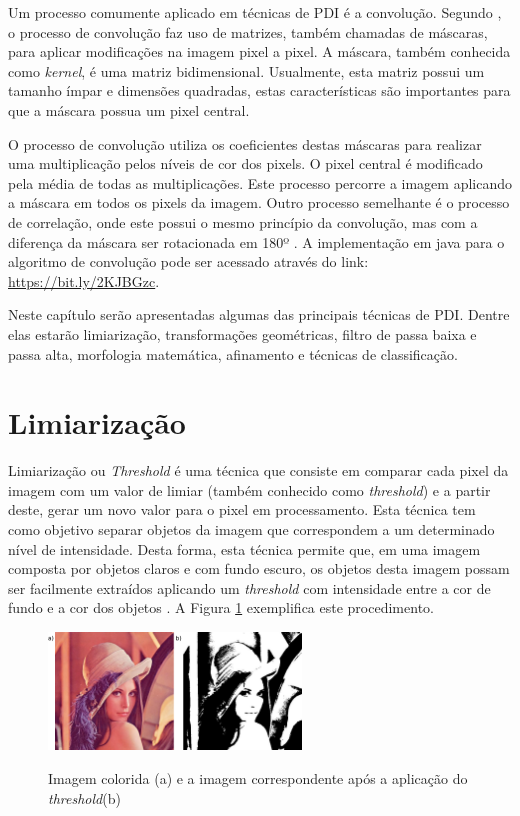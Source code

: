 \documentclass[
	12pt,				%
	oneside,			%
	a4paper,			%
	english,			%
	french,				%
	spanish,			%
	brazil,				%
	]{abntex2}
\begin{document}
Um processo comumente aplicado em técnicas de PDI é a convolução. Segundo \citet{pedriniSchwartz:2008}, o processo de convolução faz uso de matrizes, também chamadas de máscaras, para aplicar modificações na imagem pixel a pixel. A máscara, também conhecida como \textit{kernel}, é uma matriz bidimensional. Usualmente, esta matriz possui um tamanho ímpar e dimensões quadradas, estas características são importantes para que a máscara possua um pixel central.

O processo de convolução utiliza os coeficientes destas máscaras para realizar uma multiplicação pelos níveis de cor dos pixels. O pixel central é modificado pela média de todas as multiplicações. Este processo percorre a imagem aplicando a máscara em todos os pixels da imagem. Outro processo semelhante é o processo de correlação, onde este possui o mesmo princípio da convolução, mas com a diferença da máscara ser rotacionada em 180º \cite{gonzalesWoods:2008}. A implementação em java para o algoritmo de convolução pode ser acessado através do link: \url{https://bit.ly/2KJBGzc}.

Neste capítulo serão apresentadas algumas das principais técnicas de PDI. Dentre elas estarão limiarização, transformações geométricas, filtro de passa baixa e passa alta, morfologia matemática, afinamento e técnicas de classificação.
\section{Limiarização}
\label{sec:limiarizacao}

Limiarização ou \textit{Threshold} é uma técnica que consiste em comparar cada pixel da imagem com um valor de limiar (também conhecido como \textit{threshold}) e a partir deste, gerar um novo valor para o pixel em processamento. Esta técnica tem como objetivo separar objetos da imagem que correspondem a um determinado nível de intensidade. Desta forma, esta técnica permite que, em uma imagem composta por objetos claros e com fundo escuro, os objetos desta imagem possam ser facilmente extraídos aplicando um \textit{threshold} com intensidade entre a cor de fundo e a cor dos objetos \cite{gonzalesWoods:2008}. A Figura \ref{fig:limiarizacaofig} exemplifica este procedimento.

\begin{figure}[ht]
\centering

\caption{Imagem colorida (a) e a imagem correspondente após a aplicação do \textit{threshold}(b)}
\includegraphics[width=0.6\textwidth]{imagens/limiarizacao.png}
\sourceAuthor
\label{fig:limiarizacaofig}
\end{figure}
\end{document}

